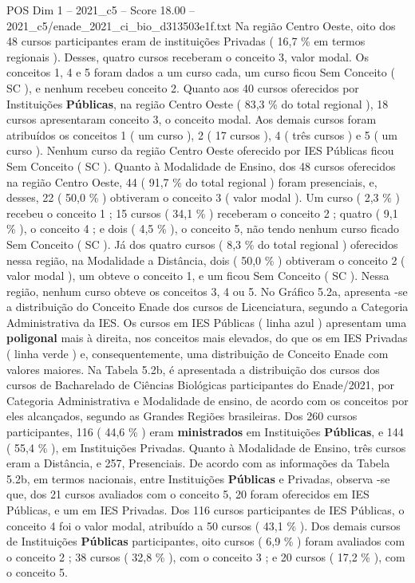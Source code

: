 \begin{textsample}{POS Dim 1 – 2021\_c5 – Score 18.00 – 2021\_c5/enade\_2021\_ci\_bio\_d313503e1f.txt}
Na região Centro Oeste, oito dos 48 cursos participantes eram de instituições Privadas ( 16,7 \% em termos regionais ).
Desses, quatro cursos receberam o conceito 3, valor modal.
Os conceitos 1, 4 e 5 foram dados a um curso cada, um curso ficou Sem Conceito ( SC ), e nenhum recebeu conceito 2.
Quanto aos 40 cursos oferecidos por Instituições \textbf{Públicas}, na região Centro Oeste ( 83,3 \% do total regional ), 18 cursos apresentaram conceito 3, o conceito modal.
Aos demais cursos foram atribuídos os conceitos 1 ( um curso ), 2 ( 17 cursos ), 4 ( três cursos ) e 5 ( um curso ).
Nenhum curso da região Centro Oeste oferecido por IES Públicas ficou Sem Conceito ( SC ).
Quanto à Modalidade de Ensino, dos 48 cursos oferecidos na região Centro Oeste, 44 ( 91,7 \% do total regional ) foram presenciais, e, desses, 22 ( 50,0 \% ) obtiveram o conceito 3 ( valor modal ).
Um curso ( 2,3 \% ) recebeu o conceito 1 ; 15 cursos ( 34,1 \% ) receberam o conceito 2 ; quatro ( 9,1 \% ), o conceito 4 ; e dois ( 4,5 \% ), o conceito 5, não tendo nenhum curso ficado Sem Conceito ( SC ).
Já dos quatro cursos ( 8,3 \% do total regional ) oferecidos nessa região, na Modalidade a Distância, dois ( 50,0 \% ) obtiveram o conceito 2 ( valor modal ), um obteve o conceito 1, e um ficou Sem Conceito ( SC ).
Nessa região, nenhum curso obteve os conceitos 3, 4 ou 5.
No Gráfico 5.2a, apresenta -se a distribuição do Conceito Enade dos cursos de Licenciatura, segundo a Categoria Administrativa da IES.
Os cursos em IES Públicas ( linha azul ) apresentam uma \textbf{poligonal} mais à direita, nos conceitos mais elevados, do que os em IES Privadas ( linha verde ) e, consequentemente, uma distribuição de Conceito Enade com valores maiores.
Na Tabela 5.2b, é apresentada a distribuição dos cursos dos cursos de Bacharelado de Ciências Biológicas participantes do Enade/2021, por Categoria Administrativa e Modalidade de ensino, de acordo com os conceitos por eles alcançados, segundo as Grandes Regiões brasileiras.
Dos 260 cursos participantes, 116 ( 44,6 \% ) eram \textbf{ministrados} em Instituições \textbf{Públicas}, e 144 ( 55,4 \% ), em Instituições Privadas.
Quanto à Modalidade de Ensino, três cursos eram a Distância, e 257, Presenciais.
De acordo com as informações da Tabela 5.2b, em termos nacionais, entre Instituições \textbf{Públicas} e Privadas, observa -se que, dos 21 cursos avaliados com o conceito 5, 20 foram oferecidos em IES Públicas, e um em IES Privadas.
Dos 116 cursos participantes de IES Públicas, o conceito 4 foi o valor modal, atribuído a 50 cursos ( 43,1 \% ).
Dos demais cursos de Instituições \textbf{Públicas} participantes, oito cursos ( 6,9 \% ) foram avaliados com o conceito 2 ; 38 cursos ( 32,8 \% ), com o conceito 3 ; e 20 cursos ( 17,2 \% ), com o conceito 5.

\end{textsample}
